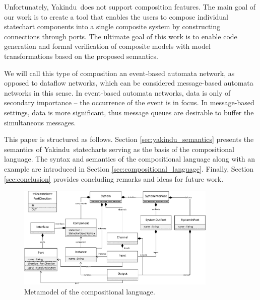 \documentclass[conference]{IEEEtran}
\newcommand{\Yakindu}{\textsf{Yakindu}}
\begin{document}
Unfortunately, \Yakindu\ does not support composition features. The main goal of our work is to create a tool that enables the users to compose individual statechart components into a single composite system by constructing connections through ports. The ultimate goal of this work is to enable code generation and formal verification of composite models with model transformations based on the proposed semantics.

We will call this type of composition an event-based automata network, as opposed to dataflow networks, which can be considered message-based automata networks in this sense. In event-based automata networks, data is only of secondary importance -- the occurrence of the event is in focus. In message-based settings, data is more significant, thus message queues are desirable to buffer the simultaneous messages.

This paper is structured as follows. Section \ref{sec:yakindu_semantics} presents the semantics of \Yakindu\ statecharts serving as the basis of the compositional language. The syntax and semantics of the compositional language along with an example are introduced in Section \ref{sec:compositional_language}. Finally, Section \ref{sec:conclusion} provides concluding remarks and ideas for future work.

\begin{figure}[!t]
	\centering
	\includegraphics[width=0.85\textwidth]{figures/metamodel_cropped2}%
	\caption{Metamodel of the compositional language.}
	\label{fig:metamodel}
\end{figure}
\end{document}
